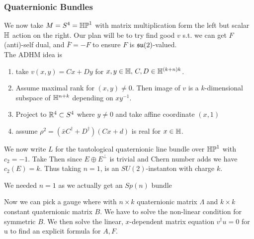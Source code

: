 \documentclass{article}
\begin{document}
\subsubsection{Quaternionic Bundles}
We now take $M = S^4 = \mathbb{HP}^1$ with matrix multiplication form the left but scalar $\mathbb{H}$ action on the right. Our plan will be to try find good $v$ s.t. we can get $F$ (anti)-self dual, and $\bar{F} = -F$ to ensure $F$ is $\mathfrak{su}(2)$-valued. \\
The ADHM idea is
\begin{enumerate}
	 \item take $v(x,y) = Cx+Dy$ for $x,y \in \mathbb{H}, \, C,D \in \mathbb{H}^{(k+n)k}$.  
	 \item Assume maximal rank for $(x,y) \neq 0$. Then image of $v$ is a $k$-dimensional subspace of $\mathbb{H}^{n+k}$ depending on $xy^{-1}$. 
	 \item Project to $\mathbb{R}^4 \subset S^4$ where $y \neq 0 $ and take affine coordinate $(x,1)$
	 \item assume $\rho^2 = (\bar{x}C^\dagger + D^\dagger)(Cx+d)$ is real for $x \in \mathbb{H}$.  
\end{enumerate}
We now write $L$ for the tautological quaternionic line bundle over $\mathbb{HP}^1$ with $c_2 = -1$. Take 
Then since $E \oplus E^\perp$ is trivial and Chern number adds we have $c_2(E) = k$. Thus taking $n=1$,
is an $SU(2)$-instanton with charge $k$.
\begin{remark}
	We needed $n=1$ as we actually get an $Sp(n)$ bundle
\end{remark}
Now we can pick a gauge where 
with $n\times k$ quaternionic matrix $\Lambda$ and $k\times k$ constant quaternionic matrix $B$. We have to solve the non-linear condition 
for symmetric $B$. We then solve the linear, $x$-dependent matrix equation $v^\dagger u = 0$ for u to find an explicit formula for $A,F$. 


\end{document}
